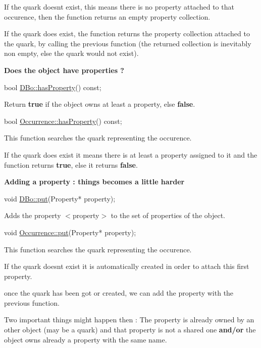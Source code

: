 If the quark doesn\textquotesingle{}t exist, this means there is no property attached to that occurence, then the function returns an empty property collection.

If the quark does exist, the function returns the property collection attached to the quark, by calling the previous function (the returned collection is inevitably non empty, else the quark would not exist).

{\bfseries Does the object have properties ?} 
\begin{DoxyCode}
\textcolor{keywordtype}{bool} \mbox{\hyperlink{classHurricane_1_1DBo_a1563f094565030c77592ed82f9a9989b}{DBo::hasProperty}}() \textcolor{keyword}{const};
\end{DoxyCode}
 Return {\bfseries true} if the object owns at least a property, else {\bfseries false}. 
\begin{DoxyCode}
\textcolor{keywordtype}{bool} \mbox{\hyperlink{classHurricane_1_1Occurrence_a0c1c6cfdf47f33166d108e2311d74e48}{Occurrence::hasProperty}}() \textcolor{keyword}{const};
\end{DoxyCode}
 This function searches the quark representing the occurence.

If the quark does exist it means there is at least a property assigned to it and the function returns {\bfseries true}, else it returns {\bfseries false}.

{\bfseries Adding a property \+: things becomes a little harder} 
\begin{DoxyCode}
\textcolor{keywordtype}{void} \mbox{\hyperlink{classHurricane_1_1DBo_a8979674f11507cb4c7c5251b41ed72d5}{DBo::put}}(Property* property);
\end{DoxyCode}
 Adds the property {\ttfamily $<$property$>$} to the set of properties of the object. 
\begin{DoxyCode}
\textcolor{keywordtype}{void} \mbox{\hyperlink{classHurricane_1_1Occurrence_aaea0bdc4f5bb4012eb52f3abe20525be}{Occurrence::put}}(Property* property);
\end{DoxyCode}
 This function searches the quark representing the occurence.

If the quark doesn\textquotesingle{}t exist it is automatically created in order to attach this first property.

once the quark has been got or created, we can add the property with the previous function.

Two important things might happen then \+: The property is already owned by an other object (may be a quark) and that property is not a shared one {\bfseries and/or} the object owns already a property with the same name.

